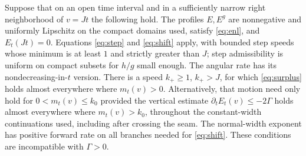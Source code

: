 \begin{lemma}\label{act:off-gap-path}
Suppose that on an open time interval and in a sufficiently narrow
right neighborhood of $v=Jt$ the following hold.
The profiles $E,E^g$ are nonnegative and uniformly Lipschitz on the
compact domains used, satisfy \eqref{eq:enl}, and $E_t(Jt)=0$.
Equations \eqref{eq:step} and \eqref{eq:shift} apply, with bounded
step speeds whose minimum is at least $1$ and strictly greater
than $J$; step admissibility is uniform on compact subsets for
$h/g$ small enough.  The angular rate has its nondecreasing-in-$t$
version.  There is a speed $k_+\ge1$, $k_+>J$, for which
\eqref{eq:surplus} holds almost everywhere where $m_t(v)>0$.
Alternatively, that motion need only hold for $0<m_t(v)\le k_0$
provided the vertical estimate $\partial_tE_t(v)\le-2\Gamma$
holds almost everywhere where $m_t(v)>k_0$, throughout the
constant-width continuations used, including after crossing the
seam.  The normal-width exponent has positive forward rate on
all branches needed for \eqref{eq:shift}.
These conditions are incompatible with $\Gamma>0$.
\end{lemma}

